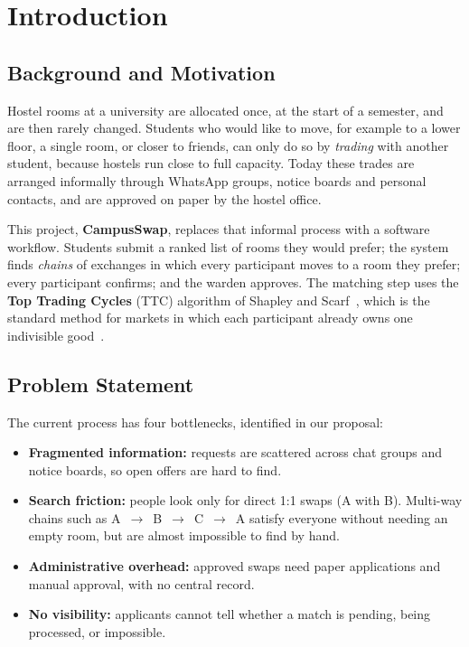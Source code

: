 \documentclass{tietreport}
\author{%
  \texttt{1024240152} Jahnavi \\
  \texttt{1024240102} Ronit Saini \\
  \texttt{1024240001} Ranvir \\
  \texttt{1024240010} Krishna Kapoor%
}
\begin{document}
\maketitle

\tableofcontents

\chapter{Introduction}

\section{Background and Motivation}

Hostel rooms at a university are allocated once, at the start of
a semester, and are then rarely changed. Students who would like
to move, for example to a lower floor, a single room, or closer to
friends, can only do so by \emph{trading} with another student,
because hostels run close to full capacity. Today these trades
are arranged informally through WhatsApp groups, notice boards and
personal contacts, and are approved on paper by the hostel office.

This project, \textbf{CampusSwap}, replaces that informal process
with a software workflow. Students submit a ranked list of rooms
they would prefer; the system finds \emph{chains} of exchanges in
which every participant moves to a room they prefer; every
participant confirms; and the warden approves. The matching step
uses the \textbf{Top Trading Cycles} (TTC) algorithm
of Shapley and Scarf~\cite{shapley1974cores}, which is the standard
method for markets in which each participant already owns one
indivisible good~\cite{abdulkadiroglu1999house}.

\section{Problem Statement}

The current process has four bottlenecks, identified in our
proposal:

\begin{itemize}
  \item \textbf{Fragmented information:} requests are scattered
    across chat groups and notice boards, so open offers are hard
    to find.
  \item \textbf{Search friction:} people look only for direct 1:1
    swaps (A with B). Multi-way chains such as
    A~$\rightarrow$~B~$\rightarrow$~C~$\rightarrow$~A satisfy everyone
    without needing an empty room, but are almost impossible to find
    by hand.
  \item \textbf{Administrative overhead:} approved swaps need paper
    applications and manual approval, with no central record.
  \item \textbf{No visibility:} applicants cannot tell whether a
    match is pending, being processed, or impossible.
\end{itemize}
\end{document}
